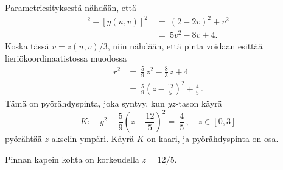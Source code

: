 Parametriesityksestä nähdään, että
\begin{align*}
[x(u,v)]^2+[y(u,v)]^2\ &=\ (2-2v)^2+v^2 \\
                       &=\ 5v^2-8v+4.
\end{align*}
Koska tässä $v=z(u,v)/3$, niin nähdään, että pinta voidaan esittää lieriökoordinaatistossa 
muodossa
\begin{align*}
r^2 &=\ \frac{5}{9}\,z^2-\frac{8}{3}\,z+4 \\
    &=\ \frac{5}{9}\left(z-\frac{12}{5}\right)^2 + \frac{4}{5}\,.
\end{align*}
Tämä on pyörähdyspinta, joka syntyy, kun $yz$-tason käyrä
\[
K:\quad y^2-\frac{5}{9}\left(z-\frac{12}{5}\right)^2 =\ \frac{4}{5}\,,\quad z \in [0,3]
\]
pyörähtää $z$-akselin ympäri. Käyrä $K$ on
 kaari, ja pyörähdyspinta on  osa.
\begin{figure}[H]
\begin{center}
\end{center}
\end{figure}
Pinnan kapein kohta on korkeudella $z=12/5$. \loppu

\pagebreak

